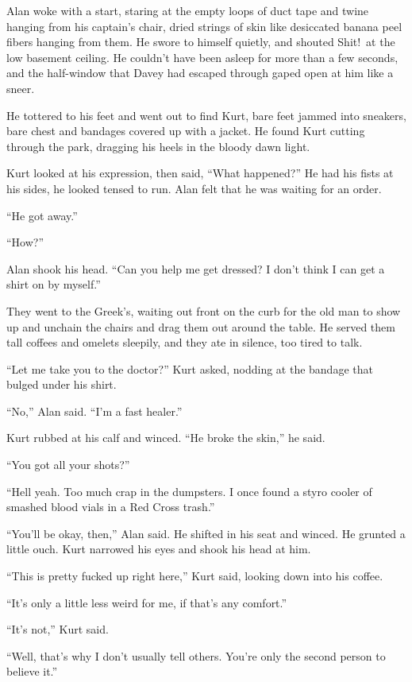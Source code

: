 \documentclass{article}
\begin{document}
Alan woke with a start, staring at the empty loops of duct tape and
twine hanging from his captain's chair, dried strings of skin like
desiccated banana peel fibers hanging from them.  He swore to himself
quietly, and shouted Shit!\ at the low basement ceiling.  He couldn't
have been asleep for more than a few seconds, and the half-window that
Davey had escaped through gaped open at him like a sneer.

He tottered to his feet and went out to find Kurt, bare feet jammed
into sneakers, bare chest and bandages covered up with a jacket.  He
found Kurt cutting through the park, dragging his heels in the bloody
dawn light.

Kurt looked at his expression, then said, ``What happened?'' He had
his fists at his sides, he looked tensed to run.  Alan felt that he
was waiting for an order.

``He got away.''

``How?''

Alan shook his head.  ``Can you help me get dressed?  I don't think I
can get a shirt on by myself.''

They went to the Greek's, waiting out front on the curb for the old
man to show up and unchain the chairs and drag them out around the
table.  He served them tall coffees and omelets sleepily, and they ate
in silence, too tired to talk.

``Let me take you to the doctor?'' Kurt asked, nodding at the bandage
that bulged under his shirt.

``No,'' Alan said.  ``I'm a fast healer.''

Kurt rubbed at his calf and winced.  ``He broke the skin,'' he said.

``You got all your shots?''

``Hell yeah.  Too much crap in the dumpsters.  I once found a styro
cooler of smashed blood vials in a Red Cross trash.''

``You'll be okay, then,'' Alan said.  He shifted in his seat and
winced.  He grunted a little ouch.  Kurt narrowed his eyes and shook
his head at him.

``This is pretty fucked up right here,'' Kurt said, looking down into
his coffee.

``It's only a little less weird for me, if that's any comfort.''

``It's not,'' Kurt said.

``Well, that's why I don't usually tell others.  You're only the
second person to believe it.''
\end{document}
